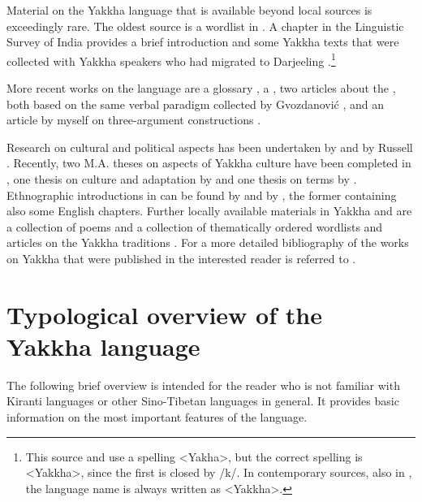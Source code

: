 Material on the Yakkha language that is available beyond local sources is exceedingly rare. The oldest source is a wordlist in \citet{Hodgson1857_Comparative}. A chapter in the Linguistic Survey of India provides a brief introduction and some Yakkha texts that were collected with Yakkha speakers who had migrated to Darjeeling \citep[305--315]{Grierson1909Linguistic}.\footnote{This source and \citet{Russell1992_Yakha} use a spelling <Yakha>, but the correct spelling is <Yakkha>, since the first  is closed by /k/. In contemporary sources, also  in , the language name is always written as <Yakkha>.} 

More recent works on the language are a  glossary \citep{Winter1996Glossary}, a   \citep{Kongren2007Yakkha}, two articles about the , both based on the same verbal paradigm collected by Gvozdanović \citep{Gvozdanovic1987How, Driem1994The-Yakkha}, and an article by myself on three-argument constructions \citep{Schackow2012_Referential}.

Research on cultural and political aspects has been undertaken by \citet{Subba1999Politics} and by Russell \citet{Russell1992_Yakha, Russell1997Identity, Russell2000_Missing, Russell2004Traditions, Russell2007Writing, Russell2010_Perceptions}. Recently, two M.A. theses on aspects of Yakkha culture have been completed in , one thesis on culture and adaptation by \citet{Rai2011_Nature}  and one thesis on  terms by  \citet{Linkha2013_kinship}. Ethnographic introductions in  can be found by \citet{Kongren2007Indigenous} and by \citet{Linkha2067Yakkha}, the former containing also some English chapters. Further locally available materials in Yakkha and  are a collection of poems \citep{Dewan2001Opchyongme} and a  collection of thematically ordered wordlists and articles on the Yakkha traditions \citep{Linkha2005Yakkha}. For a more detailed bibliography of the works on Yakkha that were published in  the interested reader is referred to \cite{Rapachaetal2008Indo}. 

 

\section{Typological overview of the Yakkha language}\label{overview-yakkha}

The following brief overview is intended for the reader who is not familiar with Kiranti languages or other Sino-Tibetan languages in general. It provides basic information on the most important features of the language.

